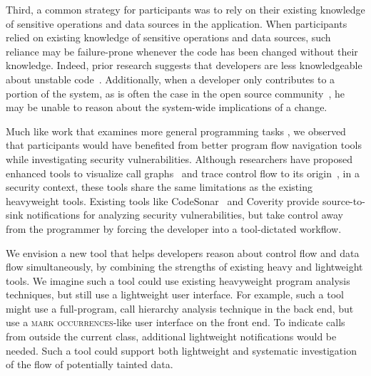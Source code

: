 \documentclass[10pt,journal,compsoc]{IEEEtran}
\begin{document}
Third, a common strategy for
participants was to rely on their existing knowledge of sensitive operations and data sources in the application.
When participants relied on existing knowledge of sensitive operations and data sources,
such reliance may be failure-prone whenever the code has been changed without their knowledge.
Indeed, prior research suggests that developers are 
less knowledgeable about unstable code~\cite{fritz2014degree}. 
Additionally, when a developer only contributes to a portion of the system, as is often the case in the open source community~\cite{mockus2002open}, he may be unable to reason about the system-wide implications of a change. 

Much like work that examines more general programming tasks \cite{latoza2010hard}, we observed that participants would have benefited from better program flow navigation tools while investigating security vulnerabilities.
Although researchers have proposed enhanced tools to visualize call graphs~\cite{latoza2011visualizing} and trace control flow to its origin~\cite{barnett2014getMeHere},
in a security context, these tools share the same limitations as the existing heavyweight tools.
Existing tools like CodeSonar~\cite{CodeSonar} and Coverity provide source-to-sink notifications for analyzing security
vulnerabilities, but take control away from the programmer by forcing the developer into a tool-dictated
workflow.


We envision a new tool that helps developers reason about control flow and data flow simultaneously,
by combining the strengths of existing heavy and lightweight tools.
We imagine such a tool could use existing heavyweight program analysis techniques, but still
use a lightweight user interface.
For example, such a tool might use a full-program, call hierarchy analysis technique in the back end,
but use a \textsc{mark occurrences}-like user interface on the front end.
To indicate calls from outside the current class, additional lightweight notifications would be needed.
Such a tool could support both lightweight and systematic investigation of the flow of 
potentially tainted data.



\end{document}
